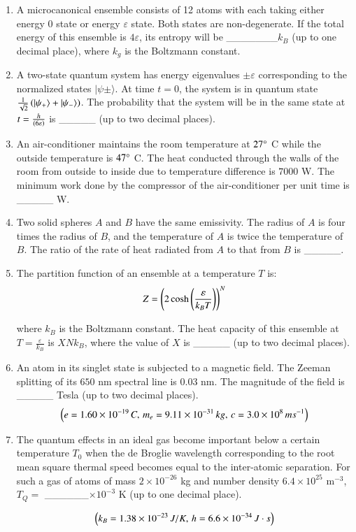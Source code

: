 \documentclass[journal,9pt,onecolumn]{IEEEtran}
\begin{document}
\begin{enumerate}
\item A microcanonical ensemble consists of 12 atoms with each taking either energy 0 state or energy $\varepsilon$ state. Both states are non-degenerate. If the total energy of this ensemble is $4\varepsilon$, its entropy will be \_\_\_\_\_\_\_$ k_B$ (up to one decimal place), where $k_g$ is the Boltzmann constant.\hfill {}

\item A two-state quantum system has energy eigenvalues $\pm \varepsilon$ corresponding to the normalized states $|\psi \pm\rangle$. At time $t = 0$, the system is in quantum state $\frac{1}{\sqrt{2}}\left(|\psi_+\rangle + |\psi_-\rangle\right)$. The probability that the system will be in the same state at $t = \frac{h}{\left(6\varepsilon\right)}$ is \_\_\_\_\_ (up to two decimal places).\hfill {}


    
\item An air-conditioner maintains the room temperature at $27\degree$ C while the outside temperature is $47\degree$ C. The heat conducted through the walls of the room from outside to inside due to temperature difference is $7000$ W. The minimum work done by the compressor of the air-conditioner per unit time is \_\_\_\_\_ W.\hfill {}

\item Two solid spheres $A$ and $B$ have the same emissivity. The radius of $A$ is four times the radius of $B$, and the temperature of $A$ is twice the temperature of $B$. The ratio of the rate of heat radiated from $A$ to that from $B$ is \_\_\_\_\_.\hfill {}


\item The partition function of an ensemble at a temperature $T$ is: $$Z = \left( 2 \cosh\left(\frac{\varepsilon}{k_B T}\right) \right)^N$$

where $k_B$ is the Boltzmann constant. The heat capacity of this ensemble at $T = \frac{\varepsilon}{k_B}$ is $X N k_B$, where the value of $X$ is \_\_\_\_\_ (up to two decimal places).\hfill {}



\item An atom in its singlet state is subjected to a magnetic field. The Zeeman splitting of its $650$ nm spectral line is $0.03$ nm. The magnitude of the field is \_\_\_\_\_ Tesla (up to two decimal places). 
$$\left(e = 1.60 \times 10^{-19} \,C,\, m_e = 9.11 \times 10^{-31} \, kg, \, c = 3.0 \times 10^8 \, ms^{-1}\right)$$
\hfill {}

\item The quantum effects in an ideal gas become important below a certain temperature $T_0$ when the de Broglie wavelength corresponding to the root mean square thermal speed becomes equal to the inter-atomic separation. For such a gas of atoms of mass $2 \times 10^{-26}$ kg and number density $6.4 \times 10^{25}$ m$^{-3}$, $T_Q =$ \_\_\_\_\_\_$\times 10^{-3}$ K (up to one decimal place).  \hfill {}

$$\left(k_B = 1.38 \times 10^{-23} \, J/K,\, h = 6.6 \times 10^{-34} \, J\cdot s\right)$$
\end{enumerate}
\end{document}
